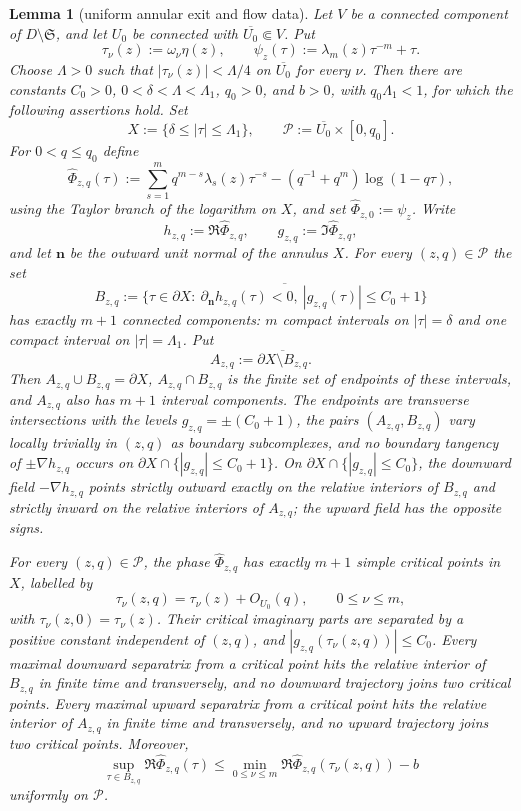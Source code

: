 \documentclass[reqno]{article}
\newtheorem{lem}[theorem]{Lemma}
\theoremstyle{definition}
\theoremstyle{remark}
\theoremstyle{plain}
\begin{document}
\begin{lem}[uniform annular exit and flow data]\label{lem:wright-exit-arcs}
Let $V$ be a connected component of $D\setminus\mathfrak S$, and let $U_0$ be connected with $\overline{U_0}\Subset V$. Put
$$\tau_\nu(z):=\omega_\nu\eta(z),\qquad \psi_z(\tau):=\lambda_m(z)\tau^{-m}+\tau.$$
Choose $\Lambda>0$ such that $|\tau_\nu(z)|<\Lambda/4$ on $\overline{U_0}$ for every $\nu$. Then there are constants $C_0>0$, $0<\delta<\Lambda<\Lambda_1$, $q_0>0$, and $b>0$, with $q_0\Lambda_1<1$, for which the following assertions hold. Set
$$X:=\{\delta\le |\tau|\le\Lambda_1\},\qquad \mathcal P:=\overline{U_0}\times[0,q_0].$$
For $0<q\le q_0$ define
$$\widehat\Phi_{z,q}(\tau):=\sum_{s=1}^m q^{m-s}\lambda_s(z)\tau^{-s}-(q^{-1}+q^m)\log(1-q\tau),$$
using the Taylor branch of the logarithm on $X$, and set $\widehat\Phi_{z,0}:=\psi_z$. Write
$$h_{z,q}:=\Re\widehat\Phi_{z,q},\qquad g_{z,q}:=\Im\widehat\Phi_{z,q},$$
and let $\mathbf n$ be the outward unit normal of the annulus $X$. For every $(z,q)\in\mathcal P$ the set
$$
B_{z,q}:=\overline{\{\tau\in\partial X:\ \partial_{\mathbf n}h_{z,q}(\tau)<0,\ |g_{z,q}(\tau)|\le C_0+1\}}
$$
has exactly $m+1$ connected components: $m$ compact intervals on $|\tau|=\delta$ and one compact interval on $|\tau|=\Lambda_1$. Put
$$A_{z,q}:=\overline{\partial X\setminus B_{z,q}}.$$
Then $A_{z,q}\cup B_{z,q}=\partial X$, $A_{z,q}\cap B_{z,q}$ is the finite set of endpoints of these intervals, and $A_{z,q}$ also has $m+1$ interval components. The endpoints are transverse intersections with the levels $g_{z,q}=\pm(C_0+1)$, the pairs $(A_{z,q},B_{z,q})$ vary locally trivially in $(z,q)$ as boundary subcomplexes, and no boundary tangency of $\pm\nabla h_{z,q}$ occurs on $\partial X\cap\{|g_{z,q}|\le C_0+1\}$. On $\partial X\cap\{|g_{z,q}|\le C_0\}$, the downward field $-\nabla h_{z,q}$ points strictly outward exactly on the relative interiors of $B_{z,q}$ and strictly inward on the relative interiors of $A_{z,q}$; the upward field has the opposite signs.

For every $(z,q)\in\mathcal P$, the phase $\widehat\Phi_{z,q}$ has exactly $m+1$ simple critical points in $X$, labelled by
$$\tau_\nu(z,q)=\tau_\nu(z)+O_{U_0}(q),\qquad 0\le\nu\le m,$$
with $\tau_\nu(z,0)=\tau_\nu(z)$. Their critical imaginary parts are separated by a positive constant independent of $(z,q)$, and $|g_{z,q}(\tau_\nu(z,q))|\le C_0$. Every maximal downward separatrix from a critical point hits the relative interior of $B_{z,q}$ in finite time and transversely, and no downward trajectory joins two critical points. Every maximal upward separatrix from a critical point hits the relative interior of $A_{z,q}$ in finite time and transversely, and no upward trajectory joins two critical points. Moreover,
$$\sup_{\tau\in B_{z,q}}\Re\widehat\Phi_{z,q}(\tau)
\le \min_{0\le\nu\le m}\Re\widehat\Phi_{z,q}(\tau_\nu(z,q))-b$$
uniformly on $\mathcal P$.
\end{lem}
\end{document}

